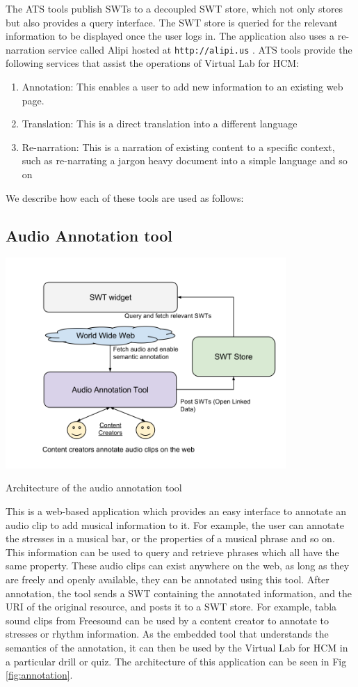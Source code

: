 \documentclass{tufte-handout}
\begin{document}
The ATS tools publish SWTs to a decoupled SWT store, which not only stores but also provides a query interface. The SWT store is queried for the relevant information to be displayed once the user logs in. The application also uses a re-narration service called Alipi hosted at \texttt{http://alipi.us} \cite{alipi}. ATS tools provide the following services that assist the operations of Virtual Lab for HCM:
\begin{enumerate}
\item Annotation: This enables a user to add new information to an existing web page.
\item Translation: This is a direct translation into a different language
\item Re-narration: This is a narration of existing content to a specific context, such as re-narrating a jargon heavy document into a simple language and so on
\end{enumerate}

We describe how each of these tools are used as follows: 

\subsection{Audio Annotation tool} 
\begin{marginfigure}
\centering
    \includegraphics[width=0.8\textwidth]{audioanno.png}
\caption{Architecture of the audio annotation tool}
\label{fig:annotation}
\end{marginfigure}
This is a web-based application which provides an easy
interface to annotate an audio clip to add musical information to it.
For example, the user can annotate the stresses in a musical bar, or the
properties of a musical phrase and so on. This information can be used to query and retrieve phrases which all have the same property. These audio clips can exist anywhere on the web, as long as they are freely and openly available, they can be annotated using this tool. After annotation, the tool sends a SWT containing the annotated information, and the URI of the original resource, and posts it to a SWT store. For example, tabla sound clips from Freesound \cite{akkermans2011freesound} can be used by a content creator to annotate to stresses or rhythm information. As the embedded tool that understands the semantics of the annotation, it can then be used by the Virtual Lab for HCM in a particular drill or quiz. The architecture of this application can be seen in Fig \ref{fig:annotation}.
\end{document}
